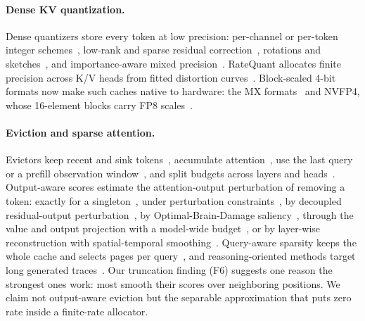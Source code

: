 \documentclass{article}
\theoremstyle{definition}
\begin{document}
\paragraph{Dense KV quantization.}
Dense quantizers store every token at low precision: per-channel or per-token integer schemes~\citep{liu2024kivi,hooper2024kvquant}, low-rank and sparse residual correction~\citep{kang2024gear}, rotations and sketches~\citep{zandieh2024qjl,zandieh2025turboquant}, and importance-aware mixed precision~\citep{yang2024mikv,he2024zipcache}.  RateQuant allocates finite precision across K/V heads from fitted distortion curves~\citep{zuo2026ratequant}.  
Block-scaled 4-bit formats now make such caches native to hardware: the MX formats~\citep{ocp2023mx} and NVFP4, whose 16-element blocks carry FP8 scales~\citep{alvarez2025nvfp4}. %

\paragraph{Eviction and sparse attention.}
Evictors keep recent and sink tokens~\citep{xiao2024streamingllm}, accumulate attention~\citep{zhang2023h2o,liu2023scissorhands}, use the last query~\citep{oren2024tova} or a prefill observation window~\citep{li2024snapkv}, and split budgets across layers and heads~\citep{cai2024pyramidkv,feng2024adakv}.  
Output-aware scores estimate the attention-output perturbation of removing a token: exactly for a singleton~\citep{goel2025caote}, under perturbation constraints~\citep{feng2026criticalkv}, by decoupled residual-output perturbation~\citep{zhang2026dropkv}, by Optimal-Brain-Damage saliency~\citep{gu2026obcache}, through the value and output projection with a model-wide budget~\citep{mai2026laprox}, or by layer-wise reconstruction with spatial-temporal smoothing~\citep{an2026restkv}. 
 Query-aware sparsity keeps the whole cache and selects pages per query~\citep{tang2024quest}, and reasoning-oriented methods target long generated traces~\citep{cai2025rkv,mao2026triattention}.  
Our truncation finding (F6) suggests one reason the strongest ones work: most smooth their scores over neighboring positions.  %
We claim not output-aware eviction but the separable approximation that puts zero rate inside a finite-rate allocator.
\end{document}
